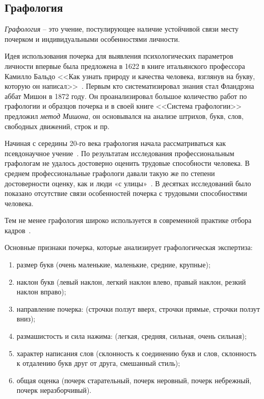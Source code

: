 \subsection{Графология}
\label{sub:domain:grafologic}
\emph{Графология} -- это учение, постулирующее наличие устойчивой связи месту почерком и индивидуальными особенностями личности.

Идея использования почерка для выявления психологических параметров личности впервые была предложена в 1622 в книге итальянского профессора Камилло Бальдо <<Как узнать природу и качества человека, взглянув на букву, которую он написал>>~\cite{kamillo_grafology}. Первым кто систематизировал знания стал Фландрэна аббат Мишон в 1872 году. Он проанализировал большое количество работ по графологии и образцов почерка и в своей книге <<Система графологии>> предложил \emph{метод Мишона}, он основывался на анализе штрихов, букв, слов, свободных движений, строк и пр.~\cite{mishon_grafology}

Начиная с середины 20-го века графология начала рассматриваться как псевдонаучное учение~\cite{graphology_wiki}. По результатам исследования профессиональным графологам не удалось достоверно оценить трудовые способности человека. В среднем профессиональные графологи давали такую же по степени достоверности оценку, как и люди «с улицы»~\cite{neter_shakhar_psevdograph, king_koehler_psevdograph}. В десятках исследований было показано отсутствие связи особенностей почерка с трудовыми способностями человека.

Тем не менее графология широко используется в современной практике отбора кадров~\cite{graphology_psyfactor}.

Основные признаки почерка, которые анализирует графологическая экспертиза:
\begin{enumerate}
  \item размер букв (очень маленькие, маленькие, средние, крупные);
  \item наклон букв (левый наклон, легкий наклон влево, правый наклон, резкий наклон вправо);
  \item направление почерка: (строчки ползут вверх, строчки прямые, строчки ползут вниз);
  \item размашистость и сила нажима: (легкая, средняя, сильная, очень сильная);
  \item характер написания слов (склонность к соединению букв и слов, склонность к отдалению букв друг от друга, смешанный стиль);
  \item общая оценка (почерк старательный, почерк неровный, почерк небрежный, почерк неразборчивый).
\end{enumerate}

